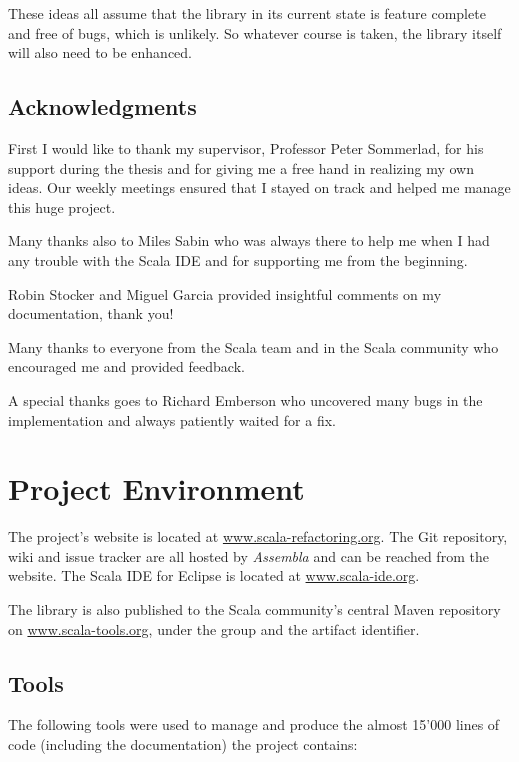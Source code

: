 \documentclass[10pt,a4paper,oneside]{scrreprt}
\begin{document}
These ideas all assume that the library in its current state is feature complete and free of bugs, which is unlikely. So whatever course is taken, the library itself will also need to be enhanced. 

\section{Acknowledgments}

First I would like to thank my supervisor, Professor Peter Sommerlad, for his support during the thesis and for giving me a free hand in realizing my own ideas. Our weekly meetings ensured that I stayed on track and helped me manage this huge project.

Many thanks also to Miles Sabin who was always there to help me when I had any trouble with the Scala IDE and for supporting me from the beginning.

Robin Stocker and Miguel Garcia provided insightful comments on my documentation, thank you!

Many thanks to everyone from the Scala team and in the Scala community who encouraged me and provided feedback. 

A special thanks goes to Richard Emberson who uncovered many bugs in the implementation and always patiently waited for a fix.

\label{end-chapter:outlook}

\appendix

\chapter{Project Environment} \label{chapter:project-environment}

The project's website is located at \url{www.scala-refactoring.org}. The Git repository, wiki and issue tracker are all hosted by \textit{Assembla} and can be reached from the website. The Scala IDE for Eclipse is located at \url{www.scala-ide.org}.

The library is also published to the Scala community's central Maven repository on \url{www.scala-tools.org}, under the  group and the   artifact identifier.

\section{Tools}

The following tools were used to manage and produce the almost 15'000 lines of code (including the documentation) the project contains:
\end{document}
